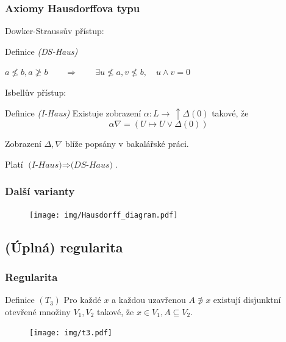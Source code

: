 \documentclass[mathserif]{beamer}
\begin{document}
\begin{frame}
\frametitle{Axiomy Hausdorffova typu}

Dowker-Straussův přístup:
\pause
\begin{block}{Definice \textit{(DS-Haus)}}
  \begin{center}
    $a \not\le b, a \not\ge b \qquad \Rightarrow \qquad \exists u\not\leq a,
    v\not\leq b, \quad u \wedge v = 0$
  \end{center}
\end{block}
\pause

Isbellův přístup:
\pause
\newcommand{\dL}{\, \uparrow \Delta(0)}
\begin{block}{Definice \textit{(I-Haus)}}
  Existuje zobrazení $\alpha\colon L \to \dL$ takové, že
  \[
    \alpha \nabla = (U \mapsto U \vee \Delta(0))
  \]
\end{block}
Zobrazení $\Delta, \nabla$ blíže popsány v bakalářské práci.
\pause

\medskip

Platí \alert{$\textit{(I-Haus)} \Rightarrow \textit{(DS-Haus)}$.}
\end{frame}


\begin{frame}
\frametitle{Další varianty}
\pause

\begin{figure}
  \texttt{[image: img/Hausdorff\_diagram.pdf]}
\end{figure}
\end{frame}


\subsection{(Úplná) regularita}

\begin{frame}
\frametitle{Regularita}

\begin{block}{Definice $(T_3)$}
  Pro každé $x$ a každou uzavřenou $A \not\owns x$ existují disjunktní otevřené
  množiny $V_1, V_2$ takové, že $x \in V_1, A \subseteq V_2$.
\end{block}

\begin{figure}
  \texttt{[image: img/t3.pdf]}
\end{figure}
\end{frame}
\end{document}
